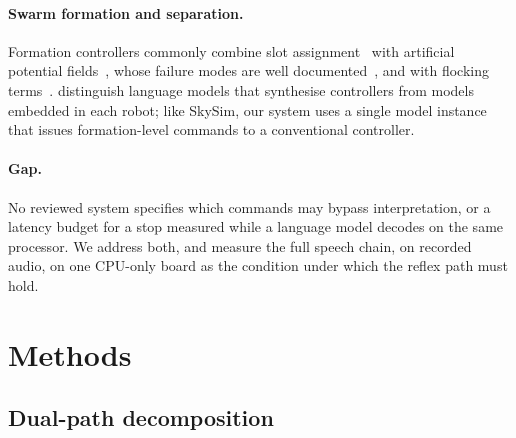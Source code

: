 \documentclass[a4paper,fleqn]{cas-dc}
\begin{document}
\paragraph{Swarm formation and separation.} Formation controllers commonly combine slot
assignment~\citep{turpin2014} with artificial potential fields~\citep{khatib1986}, whose failure
modes are well documented~\citep{koren1991}, and with flocking terms~\citep{reynolds1987}.
\citet{llm2swarm2024} distinguish language models that synthesise controllers from models embedded
in each robot; like SkySim, our system uses a single model instance that issues formation-level
commands to a conventional controller.

\paragraph{Gap.} No reviewed system specifies which commands may bypass interpretation, or a
latency budget for a stop measured while a language model decodes on the same processor. We address
both, and measure the full speech chain, on recorded audio, on one CPU-only board as the condition
under which the reflex path must hold.

\section{Methods}
\label{sec:methods}

\subsection{Dual-path decomposition}
\label{sec:dual-path}
\end{document}
